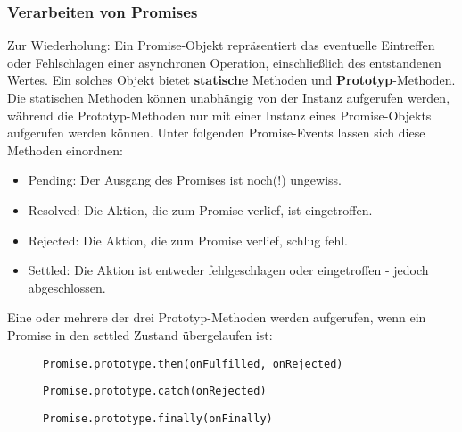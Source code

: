 \subsubsection{Verarbeiten von Promises}

Zur Wiederholung: Ein Promise-Objekt repräsentiert das eventuelle Eintreffen oder Fehlschlagen einer asynchronen Operation, einschließlich des entstandenen Wertes. Ein solches Objekt bietet \textbf{statische} Methoden und \textbf{Prototyp}-Methoden. Die statischen Methoden können unabhängig von der Instanz aufgerufen werden, während die Prototyp-Methoden nur mit einer Instanz eines Promise-Objekts aufgerufen werden können. Unter folgenden Promise-Events lassen sich diese Methoden einordnen:

\begin{itemize} 
\item Pending: Der Ausgang des Promises ist noch(!) ungewiss.
\item Resolved: Die Aktion, die zum Promise verlief, ist eingetroffen.
\item Rejected: Die Aktion, die zum Promise verlief, schlug fehl.
\item Settled: Die Aktion ist entweder fehlgeschlagen oder eingetroffen - jedoch abgeschlossen.
\end{itemize}

\noindent
Eine oder mehrere der drei Prototyp-Methoden werden aufgerufen, wenn ein Promise in den settled Zustand übergelaufen ist:

\begin{description}

\begin{figure}[H]
\item \begin{lstlisting}[basicstyle=\small]
Promise.prototype.then(onFulfilled, onRejected)
\end{lstlisting}
\end{figure}

\begin{figure}[H]
\item \begin{lstlisting}[basicstyle=\small]
Promise.prototype.catch(onRejected)
\end{lstlisting}
\end{figure}
 
\begin{figure}[H]
\item \begin{lstlisting}[basicstyle=\small]
Promise.prototype.finally(onFinally)
\end{lstlisting}
\end{figure}
 
\end{description}

